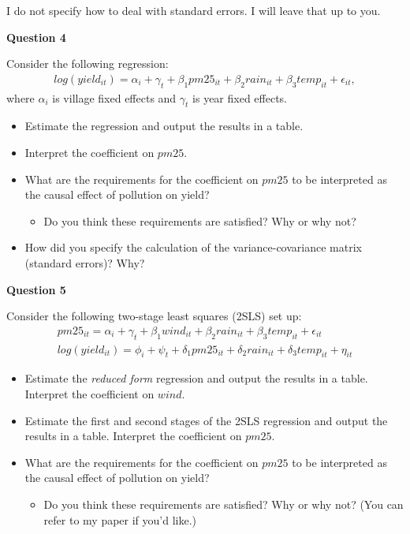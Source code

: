 \documentclass[
]{article}
\providecommand{\tightlist}{%
  \setlength{\itemsep}{0pt}\setlength{\parskip}{0pt}}
\begin{document}
I do not specify how to deal with standard errors. I will leave that up to you.

\textbf{Question 4}

Consider the following regression:
\begin{gather} \label{eq:reg} log(yield_{it}) = \alpha_i + \gamma_t + \beta_1 pm25_{it} + \beta_2 rain_{it} + \beta_3 temp_{it} + \epsilon_{it}, \end{gather}
where \(\alpha_i\) is village fixed effects and \(\gamma_t\) is year fixed effects.

\begin{itemize}
\tightlist
\item
  Estimate the regression and output the results in a table.
\item
  Interpret the coefficient on \(pm25\).
\item
  What are the requirements for the coefficient on \(pm25\) to be interpreted as the causal effect of pollution on yield?

  \begin{itemize}
  \tightlist
  \item
    Do you think these requirements are satisfied? Why or why not?
  \end{itemize}
\item
  How did you specify the calculation of the variance-covariance matrix (standard errors)? Why?
\end{itemize}

\textbf{Question 5}

Consider the following two-stage least squares (2SLS) set up:
\begin{gather}  \label{eq:iv1} pm25_{it} = \alpha_i + \gamma_t + \beta_1 wind_{it} + \beta_2 rain_{it} + \beta_3 temp_{it} + \epsilon_{it} \\
                \label{eq:iv2} log(yield_{it}) = \phi_i + \psi_t + \delta_1 pm25_{it} + \delta_2 rain_{it} + \delta_3 temp_{it} + \eta_{it} \end{gather}

\begin{itemize}
\tightlist
\item
  Estimate the \emph{reduced form} regression and output the results in a table. Interpret the coefficient on \(wind\).
\item
  Estimate the first and second stages of the 2SLS regression and output the results in a table. Interpret the coefficient on \(pm25\).
\item
  What are the requirements for the coefficient on \(pm25\) to be interpreted as the causal effect of pollution on yield?

  \begin{itemize}
  \tightlist
  \item
    Do you think these requirements are satisfied? Why or why not? (You can refer to my paper if you'd like.)
  \end{itemize}
\end{itemize}
\end{document}
